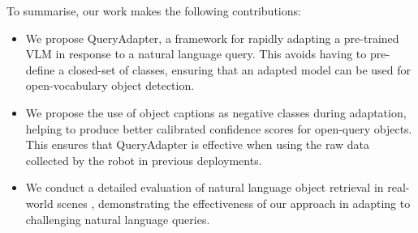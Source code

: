 To summarise, our work makes the following contributions: 
\begin{itemize}
    \item We propose QueryAdapter, a framework for rapidly adapting a pre-trained VLM in response to a natural language query.
    This avoids having to pre-define a closed-set of classes, ensuring that an adapted model can be used for open-vocabulary object detection.
    \item We propose the use of object captions as negative classes during adaptation, helping to produce better calibrated confidence scores for open-query objects. This ensures that QueryAdapter is effective when using the raw data collected by the robot in previous deployments. 
    \item We conduct a detailed evaluation of natural language object retrieval in real-world scenes \cite{scannet++}, demonstrating the effectiveness of our approach in adapting to challenging natural language queries. 
\end{itemize}